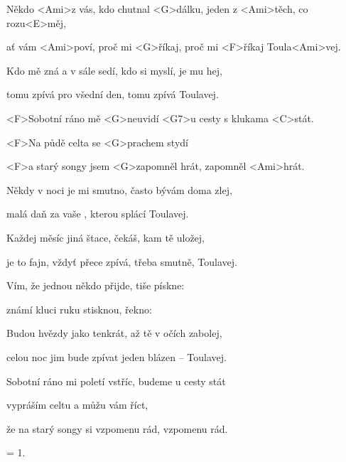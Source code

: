 

\zs
Někdo <Ami>z vás, kdo chutnal <G>dálku, jeden z <Ami>těch, co rozu<E>měj,

ať vám <Ami>poví, proč mi <G>říkaj, proč mi <F>říkaj Toula<Ami>vej.
\ks

\zs
Kdo mě zná a v sále sedí, kdo si myslí, je mu hej,

tomu zpívá pro všední den, tomu zpívá Toulavej.
\ks

\zr
<F>Sobotní ráno mě <G>neuvidí <G7>u cesty s klukama <C>stát.

<F>Na půdě celta se <G>prachem stydí

<F>a starý songy jsem <G>zapomněl hrát, zapomněl <Ami>hrát.
\kr

\zs
Někdy v noci je mi smutno, často bývám doma zlej,

malá daň za vaše , kterou splácí Toulavej.
\ks

\zs
Každej měsíc jiná štace, čekáš, kam tě uložej,

je to fajn, vždyť přece zpívá, třeba smutně, Toulavej.
\ks

\zr\kr

\zs
Vím, že jednou někdo přijde, tiše pískne: 

známí kluci ruku stisknou, řekno: 
\ks

\zs
Budou hvězdy jako tenkrát, až tě v očích zabolej,

celou noc jim bude zpívat jeden blázen -- Toulavej.
\ks

\zr
Sobotní ráno mi poletí vstříc, budeme u cesty stát

vypráším celtu a můžu vám říct,

že na starý songy si vzpomenu rád, vzpomenu rád.
\kr

\zs = 1. \ks

\kp
